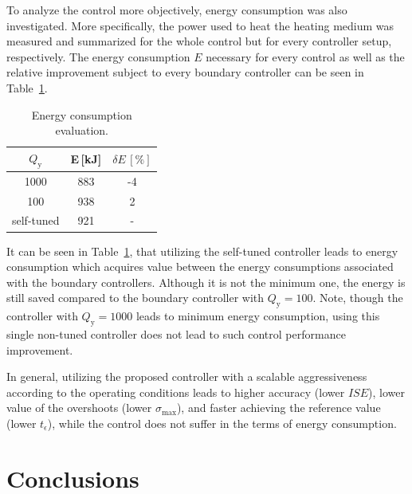 \documentclass[preprint,12pt]{elsarticle}
\begin{document}
To analyze the control more objectively, energy consumption was also investigated. More specifically, the power used to heat the heating medium was measured and summarized for the whole control but for every controller setup, respectively. The energy consumption $E$ necessary for every control as well as the relative improvement subject to every boundary controller can be seen in Table~\ref{tab:energy}.

\begin{table}[h!]
	\begin{center}
		\caption{Energy consumption evaluation.}
		\label{tab:energy}
		\begin{tabular}{c|c|c} 
			$Q_\mathrm{y}$ & E\,[kJ] & $\delta E\,[\%]$   \\
			\hline
			1000 &  883 & -4\\ 
			100 & 938 & 2 \\ 
			self-tuned & 921 & -   
		\end{tabular}
	\end{center}
\end{table}

It can be seen in Table~\ref{tab:energy}, that utilizing the self-tuned controller leads to energy consumption which acquires value between the energy consumptions associated with the boundary controllers. Although it is not the minimum one, the energy is still saved compared to the boundary controller with $Q_\mathrm{y} = 100$. Note, though the controller with $Q_\mathrm{y} = 1000$ leads to minimum energy consumption, using this single non-tuned controller does not lead to such control performance improvement.

In general, utilizing the proposed controller with a scalable aggressiveness according to the operating conditions leads to higher accuracy (lower $ISE$), lower value of the overshoots (lower $\sigma_{\mathrm{max}}$), and faster achieving the reference value (lower $t_{\epsilon}$), while the control does not suffer in the terms of energy consumption. 




\section{Conclusions}
\label{sec:conclusion}
\end{document}
